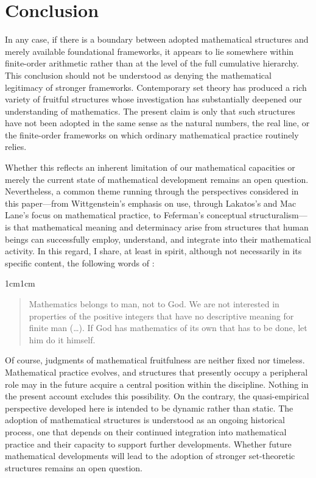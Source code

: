 \documentclass[11pt,a4paper]{article}
\begin{document}
\section{Conclusion}
\label{Conclusion}

In any case, if there is a boundary between adopted mathematical structures and merely available foundational frameworks, it appears to lie somewhere within finite-order arithmetic rather than at the level of the full cumulative hierarchy. This conclusion should not be understood as denying the mathematical legitimacy of stronger frameworks. Contemporary set theory has produced a rich variety of fruitful structures whose investigation has substantially deepened our understanding of mathematics. The present claim is only that such structures have not been adopted in the same sense as the natural numbers, the real line, or the finite-order frameworks on which ordinary mathematical practice routinely relies.

Whether this reflects an inherent limitation of our mathematical capacities or merely the current state of mathematical development remains an open question. Nevertheless, a common theme running through the perspectives considered in this paper—from Wittgenstein's emphasis on use, through Lakatos's and Mac Lane's focus on mathematical practice, to Feferman's conceptual structuralism—is that mathematical meaning and determinacy arise from structures that human beings can successfully employ, understand, and integrate into their mathematical activity. In this regard, I share, at least in spirit, although not necessarily in its specific content, the following words of \textcite[p. 2]{Bishop1967}:

\begin{adjustwidth}{1cm}{1cm}
\small
\begin{quote}
Mathematics belongs to man, not to God. We are not interested in properties of the positive integers that have no descriptive meaning for finite man (\dots). If God has mathematics of its own that has to be done, let him do it himself. 
\end{quote}
\end{adjustwidth}

Of course, judgments of mathematical fruitfulness are neither fixed nor timeless. Mathematical practice evolves, and structures that presently occupy a peripheral role may in the future acquire a central position within the discipline. Nothing in the present account excludes this possibility. On the contrary, the quasi-empirical perspective developed here is intended to be dynamic rather than static. The adoption of mathematical structures is understood as an ongoing historical process, one that depends on their continued integration into mathematical practice and their capacity to support further developments. Whether future mathematical developments will lead to the adoption of stronger set-theoretic structures remains an open question.
\end{document}
